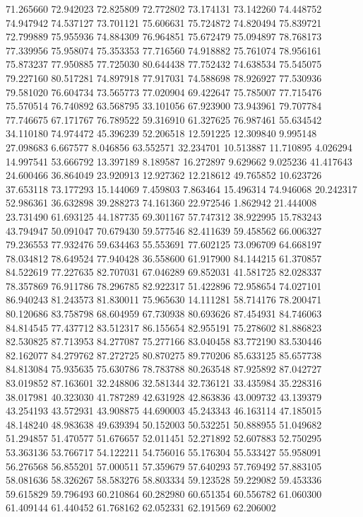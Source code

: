 71.265660
72.942023
72.825809
72.772802
73.174131
73.142260
74.448752
74.947942
74.537127
73.701121
75.606631
75.724872
74.820494
75.839721
72.799889
75.955936
74.884309
76.964851
75.672479
75.094897
78.768173
77.339956
75.958074
75.353353
77.716560
74.918882
75.761074
78.956161
75.873237
77.950885
77.725030
80.644438
77.752432
74.638534
75.545075
79.227160
80.517281
74.897918
77.917031
74.588698
78.926927
77.530936
79.581020
76.604734
73.565773
77.020904
69.422647
75.785007
77.715476
75.570514
76.740892
63.568795
33.101056
67.923900
73.943961
79.707784
77.746675
67.171767
76.789522
59.316910
61.327625
76.987461
55.634542
34.110180
74.974472
45.396239
52.206518
12.591225
12.309840
9.995148
27.098683
6.667577
8.046856
63.552571
32.234701
10.513887
11.710895
4.026294
14.997541
53.666792
13.397189
8.189587
16.272897
9.629662
9.025236
41.417643
24.600466
36.864049
23.920913
12.927362
12.218612
49.765852
10.623726
37.653118
73.177293
15.144069
7.459803
7.863464
15.496314
74.946068
20.242317
52.986361
36.632898
39.288273
74.161360
22.972546
1.862942
21.444008
23.731490
61.693125
44.187735
69.301167
57.747312
38.922995
15.783243
43.794947
50.091047
70.679430
59.577546
82.411639
59.458562
66.006327
79.236553
77.932476
59.634463
55.553691
77.602125
73.096709
64.668197
78.034812
78.649524
77.940428
36.558600
61.917900
84.144215
61.370857
84.522619
77.227635
82.707031
67.046289
69.852031
41.581725
82.028337
78.357869
76.911786
78.296785
82.922317
51.422896
72.958654
74.027101
86.940243
81.243573
81.830011
75.965630
14.111281
58.714176
78.200471
80.120686
83.758798
68.604959
67.730938
80.693626
87.454931
84.746063
84.814545
77.437712
83.512317
86.155654
82.955191
75.278602
81.886823
82.530825
87.713953
84.277087
75.277166
83.040458
83.772190
83.530446
82.162077
84.279762
87.272725
80.870275
89.770206
85.633125
85.657738
84.813084
75.935635
75.630786
78.783788
80.263548
87.925892
87.042727
83.019852
87.163601
32.248806
32.581344
32.736121
33.435984
35.228316
38.017981
40.323030
41.787289
42.631928
42.863836
43.009732
43.139379
43.254193
43.572931
43.908875
44.690003
45.243343
46.163114
47.185015
48.148240
48.983638
49.639394
50.152003
50.532251
50.888955
51.049682
51.294857
51.470577
51.676657
52.011451
52.271892
52.607883
52.750295
53.363136
53.766717
54.122211
54.756016
55.176304
55.533427
55.958091
56.276568
56.855201
57.000511
57.359679
57.640293
57.769492
57.883105
58.081636
58.326267
58.583276
58.803334
59.123528
59.229082
59.453336
59.615829
59.796493
60.210864
60.282980
60.651354
60.556782
61.060300
61.409144
61.440452
61.768162
62.052331
62.191569
62.206002

